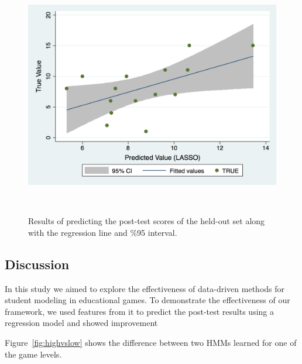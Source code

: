 \documentclass{sigchi}
\begin{document}
\begin{figure}[b]
	\centering
	\includegraphics[width=0.9\columnwidth]{figures/regression}
	\caption{Results of predicting the post-test scores of the held-out set along with the regression line and \%95 interval.}~\label{fig:regression}
\end{figure}
	
\subsection{Discussion}
In this study we aimed to explore the effectiveness of data-driven methods for student modeling in educational games. 
To demonstrate the effectiveness of our framework, we used features from it to predict the post-test results using a regression model and showed improvement 

Figure~\ref{fig:highvslow} shows the difference between two HMMs learned for one of the game levels.
\end{document}
